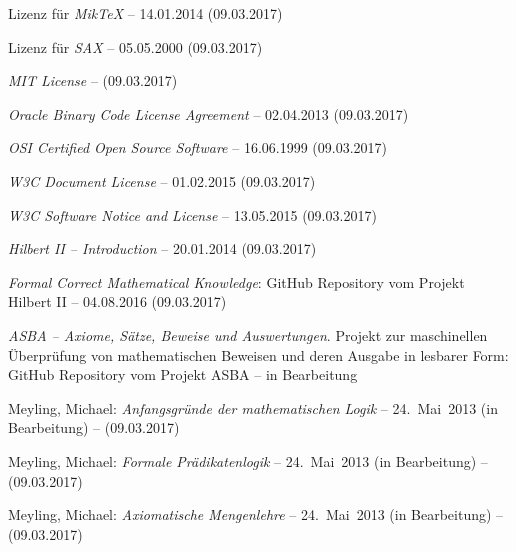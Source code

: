 \begin{flushleft}
\begin{thebibliography}{12}
		Lizenz für \emph{MikTeX}
		-- 14.01.2014
		(09.03.2017)
		
		Lizenz für \emph{SAX}
		-- 05.05.2000 (09.03.2017)
		
		\emph{MIT License}
		-- (09.03.2017)
		
		\emph{Oracle Binary Code License Agreement}
		-- 02.04.2013
		(09.03.2017)
		
		\emph{OSI Certified Open Source Software}
		-- 16.06.1999
		(09.03.2017)
		
		\emph{W3C Document License} -- 01.02.2015
		(09.03.2017)
		
		\emph{W3C Software Notice and License}
		-- 13.05.2015
		(09.03.2017)
		
		\emph{Hilbert II -- Introduction}
		-- 20.01.2014
		(09.03.2017)
		
		\emph{Formal Correct Mathematical Knowledge}:
		GitHub Repository vom Projekt Hilbert II
		-- 04.08.2016
		(09.03.2017)
		
		\emph{ASBA
			-- Axiome, Sätze, Beweise und Auswertungen}.
		Projekt zur maschinellen Überprüfung von mathematischen Beweisen
		und deren Ausgabe in lesbarer Form:
		GitHub Repository vom Projekt ASBA
		-- in Bearbeitung
		
		Meyling, Michael:
		\emph{Anfangsgründe der mathematischen Logik}
		-- 24.~Mai~2013 (in Bearbeitung)
		-- (09.03.2017)
		
		Meyling, Michael:
		\emph{Formale Prädikatenlogik}
		-- 24.~Mai~2013 (in Bearbeitung)
		-- (09.03.2017)
		
		Meyling, Michael:
		\emph{Axiomatische Mengenlehre}
		-- 24.~Mai~2013 (in Bearbeitung)
		-- (09.03.2017)
		

\end{thebibliography}
\end{flushleft}
